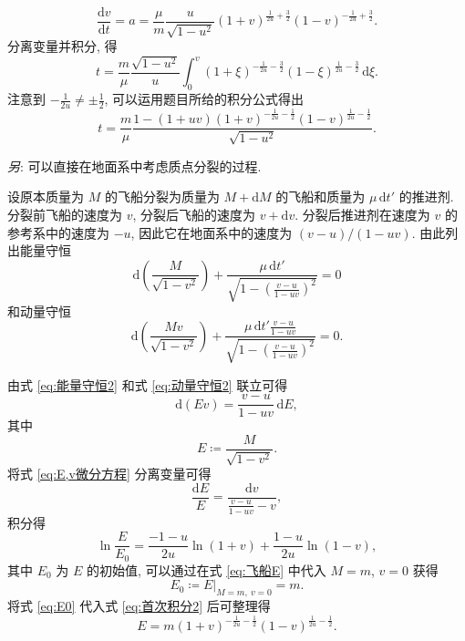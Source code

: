 \documentclass{article}
\begin{document}
\begin{equation}
	\frac{\mathrm dv}{\mathrm dt}=a=\frac\mu m\frac u{\sqrt{1-u^2}}
	\left(1+v\right)^{\frac1{2u}+\frac32}\left(1-v\right)^{-\frac1{2u}+\frac32}.
\end{equation}
分离变量并积分, 得
\begin{equation}
	\label{eq:使用积分公式前}
	t=\frac m\mu\frac{\sqrt{1-u^2}}u\int_0^v\left(1+\xi\right)^{-\frac1{2u}-\frac32}
	\left(1-\xi\right)^{\frac1{2u}-\frac32}\,\mathrm d\xi.
\end{equation}
注意到 $-\frac1{2u}\ne\pm\frac12$, 可以运用题目所给的积分公式得出
\begin{equation}
	t=\frac m\mu\frac{1-\left(1+uv\right)\left(1+v\right)^{-\frac1{2u}-\frac12}
	\left(1-v\right)^{\frac1{2u}-\frac12}}{\sqrt{1-u^2}}.
\end{equation}

\textit{另}: 可以直接在地面系中考虑质点分裂的过程.

设原本质量为 $M$ 的飞船分裂为质量为 $M+\mathrm dM$ 的飞船和质量为 $\mu\,\mathrm dt'$ 的推进剂.
分裂前飞船的速度为 $v$, 分裂后飞船的速度为 $v+\mathrm dv$.
分裂后推进剂在速度为 $v$ 的参考系中的速度为 $-u$, 因此它在地面系中的速度为
$\left(v-u\right)/\left(1-uv\right)$.
由此列出能量守恒
\begin{equation}
	\label{eq:能量守恒2}
	\mathrm d\!\left(\frac M{\sqrt{1-v^2}}\right)+
	\frac{\mu\,\mathrm dt'}{\sqrt{1-\left(\frac{v-u}{1-uv}\right)^2}}=0
\end{equation}
和动量守恒
\begin{equation}
	\label{eq:动量守恒2}
	\mathrm d\!\left(\frac{Mv}{\sqrt{1-v^2}}\right)+
	\frac{\mu\,\mathrm dt'\frac{v-u}{1-uv}}{\sqrt{1-\left(\frac{v-u}{1-uv}\right)^2}}=0.
\end{equation}

由式 \ref{eq:能量守恒2} 和式 \ref{eq:动量守恒2} 联立可得
\begin{equation}
	\label{eq:E,v微分方程}
	\mathrm d\!\left(Ev\right)=\frac{v-u}{1-uv}\,\mathrm dE,
\end{equation}
其中
\begin{equation}
	\label{eq:飞船E}
	E\coloneqq \frac M{\sqrt{1-v^2}}.
\end{equation}
将式 \ref{eq:E,v微分方程} 分离变量可得
\begin{equation}
	\frac{\mathrm dE}E=\frac{\mathrm dv}{\frac{v-u}{1-uv}-v},
\end{equation}
积分得
\begin{equation}
	\label{eq:首次积分2}
	\ln\frac E{E_0}=\frac{-1-u}{2u}\ln\!\left(1+v\right)
	+\frac{1-u}{2u}\ln\!\left(1-v\right),
\end{equation}
其中 $E_0$ 为 $E$ 的初始值, 可以通过在式 \ref{eq:飞船E} 中代入 $M=m$, $v=0$ 获得
\begin{equation}
	\label{eq:E0}
	E_0\coloneqq \left.E\right|_{M=m,~v=0}=m.
\end{equation}
将式 \ref{eq:E0} 代入式 \ref{eq:首次积分2} 后可整理得
\begin{equation}
	\label{eq:E关于v}
	E=m\left(1+v\right)^{-\frac1{2u}-\frac12}\left(1-v\right)^{\frac1{2u}-\frac12}.
\end{equation}
\end{document}
